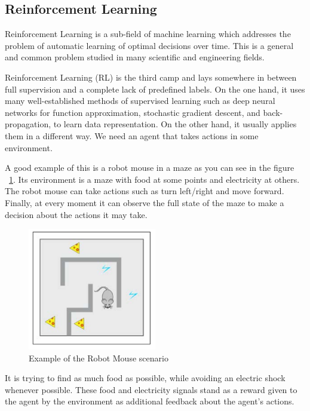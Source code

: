 \newpage
\subsection[Reinforcement Learning]{Reinforcement Learning}

Reinforcement Learning is a sub-field of machine learning which addresses
the problem of automatic learning of optimal decisions over time. This is
a general and common problem studied in many scientific and engineering fields.\cite{reinforcement-learning}

Reinforcement Learning (RL) is the third camp and lays somewhere in between full supervision and a complete lack of predefined labels. On the one hand, it uses many well-established methods of supervised learning such as deep neural networks for function approximation, stochastic gradient descent, and back-propagation, to learn data representation.
On the other hand, it usually applies them in a different way. We need an agent that takes actions in some environment.

A good example of this is a robot mouse in a maze as you can see in the figure ~\ref{fig:maze}. Its environment is a maze with food at some points and electricity at others. 
The robot mouse can take actions such as turn left/right and move forward. Finally, at every moment it can observe the full state of the maze to make a 
decision about the actions it may take.
\begin{figure}[H]
\centering
\includegraphics[width=0.5\textwidth]{./figures/robotmouse-maze}
\caption{Example of the Robot Mouse scenario \cite{reinforcement-learning}}
\label{fig:maze}
\end{figure}
It is trying to find as much food as  possible, while avoiding an electric shock whenever possible. These food and electricity signals stand as a reward given to the agent by the environment as additional feedback about the agent's actions.

